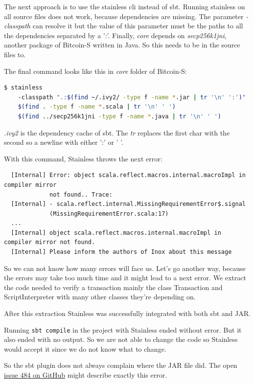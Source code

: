 \documentclass[runningheads]{llncs}
\begin{document}
The next approach is to use the stainless cli instead of sbt.  Running
stainless on all source files does not work, because dependencies are
missing.  The parameter \emph{-classpath} can resolve it but the value
of this parameter must be the paths to all the dependencies separated
by a ':'.  Finally, \emph{core} depends on \emph{secp256k1jni},
another package of Bitcoin-S written in Java.  So this needs to be in
the source files to.

The final command looks like this in \emph{core} folder of Bitcoin-S:
\begin{lstlisting}[language=bash]
  $ stainless
    -classpath ".:$(find ~/.ivy2/ -type f -name *.jar | tr '\n' ':')"
    $(find . -type f -name *.scala | tr '\n' ' ')
    $(find ../secp256k1jni -type f -name *.java | tr '\n' ' ')
\end{lstlisting}

\emph{.ivy2} is the dependency cache of sbt.  The \emph{tr} replaces
the first char with the second so a newline with either ':' or ' '.

With this command, Stainless throws the next error:
\begin{verbatim}
  [Internal] Error: object scala.reflect.macros.internal.macroImpl in compiler mirror
             not found.. Trace:
  [Internal] - scala.reflect.internal.MissingRequirementError$.signal
             (MissingRequirementError.scala:17)
  ...
  [Internal] object scala.reflect.macros.internal.macroImpl in compiler mirror not found.
  [Internal] Please inform the authors of Inox about this message
\end{verbatim}

So we can not know how many errors will face us.  Let's go another
way, because the errors may take too much time and it might lead to a
next error.  We extract the code needed to verify a transaction mainly
the class Transaction and ScriptInterpreter with many other classes
they're depending on.

After this extraction Stainless was successfully integrated with both
sbt and JAR.

Running \texttt{sbt compile} in the project with Stainless ended
without error.  But it also ended with no output.  So we are not able
to change the code so Stainless would accept it since we do not know
what to change.

So the sbt plugin does not always complain where the JAR file did.
The open
\href{https://github.com/epfl-lara/stainless/issues/484}{issue 484 on
  GitHub} might describe exactly this error.
\end{document}
